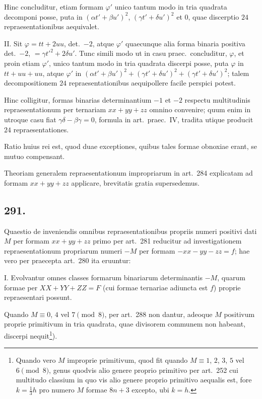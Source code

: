 \documentclass[12pt,a4paper]{article}
\theoremstyle{plain}
\theoremstyle{definition}
\theoremstyle{remark}
\begin{document}
Hinc concluditur, etiam formam $\varphi'$ unico tantum modo in tria quadrata
decomponi posse, puta in $(\alpha t' + \beta u')^2$, $(\gamma t' + \delta u')^2$ et $0$, quae discerptio
$24$ repraesentationibus aequivalet.

\textsc{II.} Sit $\varphi = tt + 2uu$, det.\@~$-2$, atque $\varphi'$ quaecunque alia forma
binaria positiva det.\@~$-2$, $= \gamma t'^2 + 2\delta u'$. Tunc simili modo ut in casu
praec.\ concluditur, $\varphi$, et proin etiam $\varphi'$, unico tantum modo in tria quadrata
discerpi posse, puta $\varphi$ in $tt + uu + uu$, atque $\varphi'$ in
$(\alpha t' + \beta u')^2 + (\gamma t' + \delta u')^2 + (\gamma t' + \delta u')^2$; talem decompositionem
$24$ repraesentationibus aequipollere facile perspici potest.

Hinc colligitur, formas binarias determinantium $-1$ et $-2$ respectu multitudinis
repraesentationum per ternariam $xx + yy + zz$ omnino convenire; quum enim in
utroque casu fiat $\gamma\delta - \beta\gamma = 0$, formula in art.\@~praec.\ IV, tradita utique
producit $24$ repraesentationes.

Ratio huius rei est, quod duae exceptiones, quibus tales formae obnoxiae erant,
se mutuo compensant.

Theoriam generalem repraesentationum impropriarum in art.\@~284 explicatam
ad formam $xx + yy + zz$ applicare, brevitatis gratia supersedemus.

\subsection*{291.}

Quaestio de inveniendis omnibus repraesentationibus propriis numeri positivi
dati $M$ per formam $xx + yy + zz$ primo per art.\@~281 reducitur ad
investigationem repraesentationum propriarum numeri $-M$ per formam
$-xx - yy - zz = f$; hae vero per praecepta art.\@~280 ita eruuntur:

\textsc{I.} Evolvantur omnes classes formarum binariarum determinantis $-M$,
quarum formae per $XX + YY + ZZ = F$ (cui formae ternariae adiuncta est $f$)
proprie repraesentari possunt.

Quando $M \equiv 0$, $4$ vel $7 \pmod{8}$, per art.\@~288 non dantur, adeoque $M$
positivum proprie primitivum in tria quadrata, quae divisorem communem non
habeant, discerpi nequit\footnote{Quando vero $M$ improprie primitivum, quod fit
quando $M \equiv 1$, $2$, $3$, $5$ vel $6 \pmod{8}$, genus quodvis alio genere proprio
primitivo per art.\@~252 cui multitudo classium in quo vis alio genere proprio
primitivo aequalis est, fore $k = \tfrac{1}{3}h$ pro numero $M$ formae $8n+3$ excepto,
ubi $k = h$.}).
\end{document}
